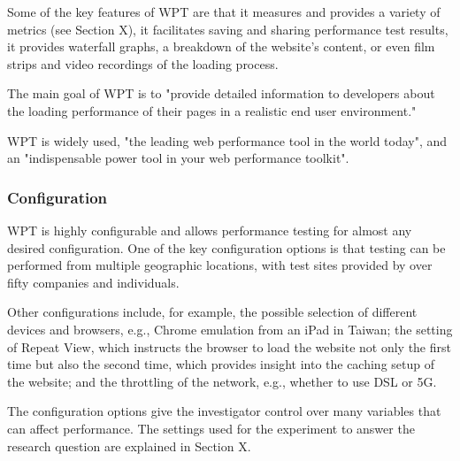 Some of the key features of WPT are that it measures and provides a variety of metrics (see Section X), it facilitates saving and sharing performance test results, it provides waterfall graphs, a breakdown of the website's content, or even film strips and video recordings of the loading process. %

The main goal of WPT is to "provide detailed information to developers about the loading performance of their pages in a realistic end user environment." %

WPT is widely used, "the leading web performance tool in the world today", and an "indispensable power tool in your web performance toolkit". %



\subsubsection{Configuration} %

WPT is highly configurable and allows performance testing for almost any desired configuration.
One of the key configuration options is that testing can be performed from multiple geographic locations, with test sites provided by over fifty companies and individuals. %

Other configurations include, for example, the possible selection of different devices and browsers, e.g., Chrome emulation from an iPad in Taiwan; the setting of Repeat View, which instructs the browser to load the website not only the first time but also the second time, which provides insight into the caching setup of the website; and the throttling of the network, e.g., whether to use DSL or 5G.

The configuration options give the investigator control over many variables that can affect performance. 
The settings used for the experiment to answer the research question are explained in Section X.



